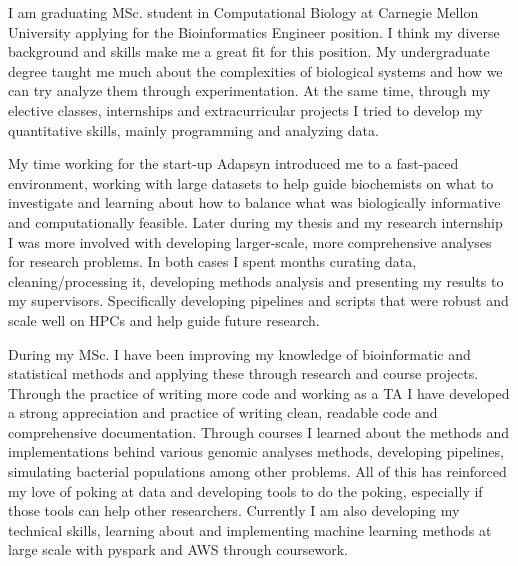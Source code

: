 \documentclass[11pt, a4paper]{./Awesome-CV/awesome-cv}
\begin{document}
\makelettertitle %

\begin{cvletter}

    I am graduating MSc. student in Computational Biology at Carnegie Mellon University
applying for the Bioinformatics Engineer position.
I think my diverse background and skills make me a great fit for this position.
My undergraduate degree taught me much about the complexities of biological systems and how we can try analyze them through experimentation.
At the same time, through my elective classes, internships and extracurricular projects I tried to develop my quantitative skills, mainly programming and analyzing data.

My time working for the start-up Adapsyn introduced me to a fast-paced environment, working with large datasets to help guide biochemists on what to investigate and learning about how to balance what was biologically informative and computationally feasible.
Later during my thesis and my research internship I was more involved with developing larger-scale, more comprehensive analyses for research problems.
In both cases I spent months curating data, cleaning/processing it, developing methods analysis and presenting my results to my supervisors.
Specifically developing pipelines and scripts that were robust and scale well on HPCs and help guide future research.

During my MSc. I have been improving my knowledge of bioinformatic and statistical methods and applying these through research and course projects.
Through the practice of writing more code and working as a TA I have developed a strong appreciation and practice of writing clean, readable code and comprehensive documentation.
Through courses I learned about the methods and implementations behind various genomic analyses methods, developing pipelines, simulating bacterial populations among other problems.
All of this has reinforced my love of poking at data and developing tools to do the poking, especially if those tools can help other researchers.
Currently I am also developing my technical skills, learning about and implementing machine learning methods at large scale with pyspark and AWS through coursework.



\end{cvletter}
\end{document}
